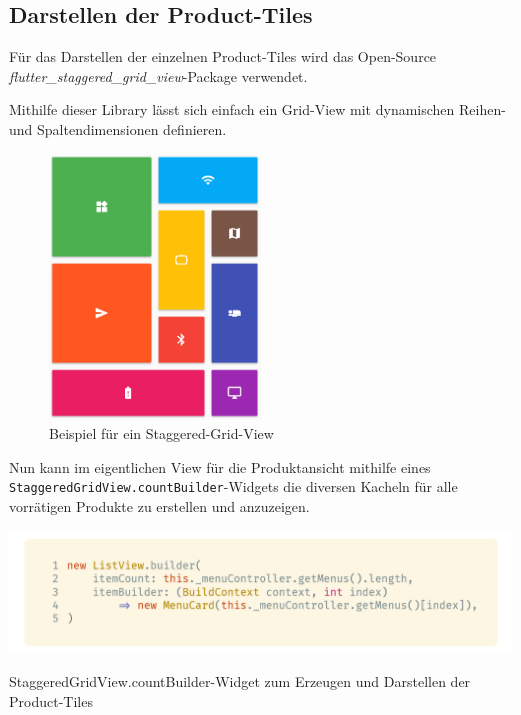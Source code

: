 \subsection{Darstellen der Product-Tiles}

Für das Darstellen der einzelnen Product-Tiles wird das Open-Source \textit{flutter\_staggered\_grid\_view}-Package
verwendet. \cite{flutterStaggeredGridView}

Mithilfe dieser Library lässt sich einfach ein Grid-View mit dynamischen Reihen- und 
Spaltendimensionen definieren.

\begin{figure}[H]
    \centering
    \includegraphics[width=0.5\textwidth]{images/Client/views/productview/staggeredGrid.png}
    \caption{Beispiel für ein Staggered-Grid-View \cite{flutterStaggeredGridViewImage}}
\end{figure}

Nun kann im eigentlichen View für die Produktansicht mithilfe eines
\lstinline{StaggeredGridView.countBuilder}-Widgets die diversen Kacheln für alle vorrätigen Produkte
zu erstellen und anzuzeigen.

\begin{code}[H]
    \centering
    \includegraphics[width=1\textwidth]{images/Client/views/menuview/menuListViewBuilder.png}
    \vspace{-20pt}
    \caption{StaggeredGridView.countBuilder-Widget zum Erzeugen und Darstellen der Product-Tiles}
\end{code}

\newpage